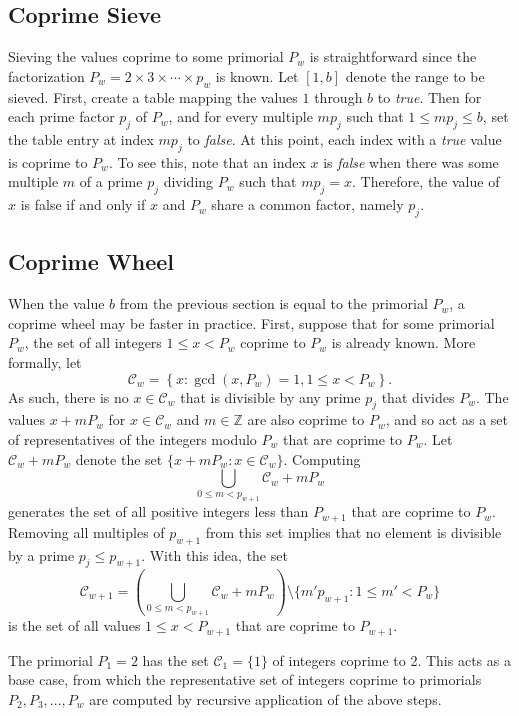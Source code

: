 \documentclass{ucalgthes1}
\theoremstyle{definition}
\newcommand{\ZZ}{\mathbb{Z}}
\newcommand{\set}{\mathcal}
\begin{document}
\subsection{Coprime Sieve}

Sieving the values coprime to some primorial $P_w$ is straightforward since the factorization $P_w = 2 \times 3 \times \cdots \times p_w$ is known.  Let $[1,b]$ denote the range to be sieved.  First, create a table mapping the values $1$ through $b$ to \emph{true}.  Then for each prime factor $p_j$ of $P_w$, and for every multiple $mp_j$ such that $1 \le mp_j \le b$, set the table entry at index $mp_j$ to \emph{false}.  At this point, each index with a \emph{true} value is coprime to $P_w$.  To see this, note that an index $x$ is \emph{false} when there was some multiple $m$ of a prime $p_j$ dividing $P_w$ such that $mp_j = x$.  Therefore, the value of $x$ is false if and only if $x$ and $P_w$ share a common factor, namely $p_j$.

\subsection{Coprime Wheel}
\label{subsec:coprimeWheel}
\newcommand{\coprimeset}{\set C}
\newcommand{\coprimelist}{\set D}

When the value $b$ from the previous section is equal to the primorial $P_w$, a coprime wheel may be faster in practice.  First, suppose that for some primorial $P_w$, the set of all integers $1 \le x < P_w$ coprime to $P_w$ is already known.  More formally, let
\[
	\coprimeset_w = \left\{x : \gcd(x, P_w) = 1, 1 \le x < P_w \right\}.
\]
As such, there is no $x \in \coprimeset_w$ that is divisible by any prime $p_j$ that divides $P_w$.  The values $x + mP_w$ for $x \in \coprimeset_w$ and $m \in \ZZ$ are also coprime to $P_w$, and so act as a set of representatives of the integers modulo $P_w$ that are coprime to $P_w$.  Let $\coprimeset_w + mP_w$ denote the set $\{x + mP_w : x \in \coprimeset_w\}$.  Computing
\[
	\bigcup_{0 \le m < p_{w+1}} \coprimeset_w + mP_w
\]
generates the set of all positive integers less than $P_{w+1}$ that are coprime to $P_w$.  Removing all multiples of $p_{w+1}$ from this set implies that no element is divisible by a prime $p_j \le p_{w+1}$.  With this idea, the set
\[
	\coprimeset_{w+1} =
		\left( \bigcup_{0 \le m < p_{w+1}} \coprimeset_w + mP_w \right)
	    \setminus \{ m' p_{w+1} : 1 \le m' < P_w \}
\]
is the set of all values $1 \le x < P_{w+1}$ that are coprime to $P_{w+1}$.

The primorial $P_1 = 2$ has the set $\coprimeset_1 = \{1\}$ of integers coprime to 2.  This acts as a base case, from which the representative set of integers coprime to primorials $P_2, P_3, ..., P_w$ are computed by recursive application of the above steps.
\end{document}
